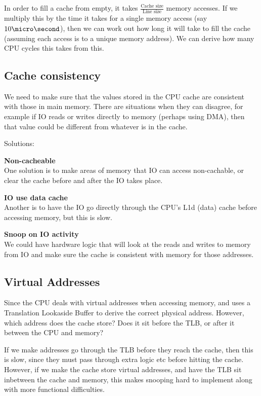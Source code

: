 In order to fill a cache from empty, it takes $\frac{\text{Cache
size}}{\text{Line size}}$ memory accesses. If we multiply this by the time it
takes for a single memory access (say $10\micro\second$), then we can work out
how long it will take to fill the cache (assuming each access is to a unique
memory address). We can derive how many CPU cycles this takes from this.

\subsection{Cache consistency}

We need to make sure that the values stored in the CPU cache are consistent with
those in main memory. There are situations when they can disagree, for example
if IO reads or writes directly to memory (perhaps using DMA), then that value
could be different from whatever is in the cache.

Solutions:
\begin{description}
  \item \textbf{Non-cacheable}\\
    One solution is to make areas of memory that IO can access non-cachable, or
    clear the cache before and after the IO takes place.
  \item \textbf{IO use data cache}\\
    Another is to have the IO go directly through the CPU's L1d (data) cache
    before accessing memory, but this is slow.
  \item \textbf{Snoop on IO activity}\\
    We could have hardware logic that will look at the reads and writes to
    memory from IO and make sure the cache is consistent with memory for those
    addresses.
\end{description}

\subsection{Virtual Addresses}

Since the CPU deals with virtual addresses when accessing memory, and uses a
Translation Lookaside Buffer to derive the correct physical address. However,
which address does the cache store? Does it sit before the TLB, or after it
between the CPU and memory?

If we make addresses go through the TLB before they reach the cache, then this
is slow, since they must pass through extra logic etc before hitting the cache.
However, if we make the cache store virtual addresses, and have the TLB sit
inbetween the cache and memory, this makes snooping hard to implement along with
more functional difficulties.

